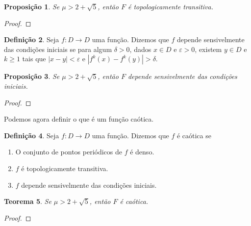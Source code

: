 \documentclass[a4paper, 12pt]{article}
\theoremstyle{definition}
\newtheorem{definition}{Definição}[section]
\theoremstyle{plain}
\newtheorem{proposition}[definition]{Proposição}
\theoremstyle{plain}
\theoremstyle{plain}
\newtheorem{theorem}[definition]{Teorema}
\theoremstyle{remark}
\begin{document}
\begin{proposition}
Se $\mu > 2 + \sqrt{5}$, então $F$ é topologicamente transitiva.
\end{proposition}

\begin{proof}

\end{proof}

\begin{definition}
Seja $f: D \rightarrow D$ uma função. Dizemos que $f$ depende sensivelmente das condições iniciais se para algum $\delta > 0$, dados $x \in D$ e $\varepsilon > 0$, existem $y \in D$ e $k \geq 1$ tais que $|x - y| < \varepsilon$ e $|f^k(x) - f^k(y)| > \delta$.
\end{definition}

\begin{proposition}
Se $\mu > 2 + \sqrt{5}$, então $F$ depende sensivelmente das condições iniciais.
\end{proposition}

\begin{proof}

\end{proof}

Podemos agora definir o que é um função caótica.

\begin{definition}
Seja $f: D \rightarrow D$ uma função. Dizemos que $f$ é caótica se
\begin{enumerate}
\item O conjunto de pontos periódicos de $f$ é denso.
\item $f$ é topologicamente transitiva.
\item $f$ depende sensivelmente das condições iniciais.
\end{enumerate}
\end{definition}

\begin{theorem}
Se $\mu > 2 + \sqrt{5}$, então $F$ é caótica.
\end{theorem}

\begin{proof}

\end{proof}
\end{document}
